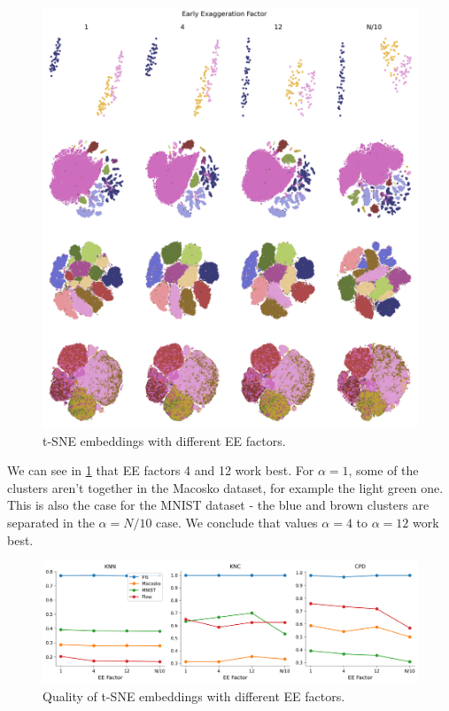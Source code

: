 \begin{figure}[h]
    \centering 
        \includegraphics[width=\linewidth]{../code/figures/alpha_embedding_grid_tab20b.png}
        \caption{t-SNE embeddings with different EE factors.}
    \label{fig:alpha_grid}
\end{figure}

We can see in \ref{fig:alpha_grid} that EE factors 4 and 12 work best. For $\alpha=1$, some of the clusters aren't together in the Macosko dataset, for example the light green one. This is also the case for the MNIST dataset - the blue and brown clusters are separated in the $\alpha = N/10$ case. We conclude that values $\alpha=4$ to $\alpha=12$ work best. 

\begin{figure}[h]
    \centering 
        \includegraphics[width=\linewidth]{../code/figures/alpha_3_quality_measures.png}
        \caption{Quality of t-SNE embeddings with different EE factors.}
    \label{fig:alpha_quality}
\end{figure}


